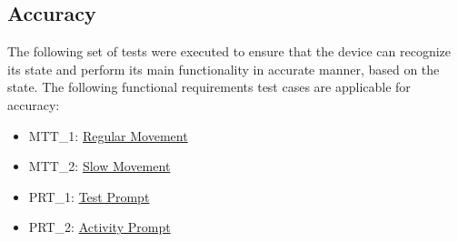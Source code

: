 \documentclass[12pt, titlepage]{article}
\begin{document}
\subsection{Accuracy}
The following set of tests were executed to ensure that the device can recognize its state and perform its main functionality in accurate manner, based on the state.
The following functional requirements test cases are applicable for accuracy:

\begin{itemize}
  \item MTT\_1: \hyperref[MTT1]{Regular Movement}
  \item MTT\_2: \hyperref[MTT2]{Slow Movement}
  \item PRT\_1: \hyperref[PRT1]{Test Prompt}
  \item PRT\_2: \hyperref[PRT2]{Activity Prompt}
\end{itemize}
\end{document}
